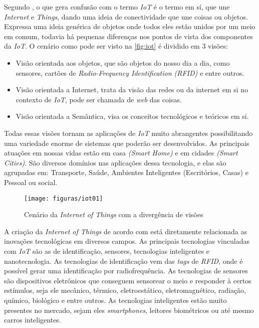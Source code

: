 \par Segundo , o que gera confus\~ao com o termo \emph{IoT} é o termo em sí, que une \emph{Internet} e \emph{Things}, dando uma ideia de conectividade que une coisas ou objetos. Expressa uma ideia genérica de objetos onde todos eles est\~ao unidos por um meio em comum, todavia há pequenas diferenças nos pontos de vista dos componentes da \emph{IoT}. O cenário como pode ser visto na \autoref{fig:iot} é dividido em 3 visões:
\begin{itemize}
    \item Visão orientada aos objetos, que são objetos do nosso dia a dia, como sensores, cart\~oes de \emph{Radio-Frequency Identification (RFID)} e entre outros.
    \item Visão orientada a Internet, trata da visão das redes ou da internet em si no contexto de \emph{IoT}, pode ser chamada de \emph{web} das coisas.
    \item Visão orientada a Semântica, visa os conceitos tecnol\'ogicos e te\'oricos em si.
\end{itemize}
Todas essas vis\~oes tornam as aplicações de \emph{IoT} muito abrangentes possibilitando uma variedade enorme de sistemas que poderão ser desenvolvidos. As principais atuações em nossas vidas estão em casa \emph{(Smart Home)} e em cidades \emph{(Smart Cities)}. São diversos domínios nas aplicações dessa tecnologia, e elas são agrupadas em: Transporte, Saúde, Ambientes Inteligentes (Escritórios, Casas) e Pessoal ou social.

\begin{figure}[ht]
	\caption{Cen\'ario da \emph{Internet of Things} com a diverg\^encia de vis\~oes}
	\centering
		\texttt{[image: figuras/iot01]}
    \label{fig:iot}	
\end{figure}

\par A criação da \emph{Internet of Things} de acordo com  está diretamente relacionada as inovações tecnológicas em diversos campos. As principais tecnologias vinculadas com \emph{IoT} são as de identificação, sensores, tecnologias inteligentes e nanotecnologia.
As tecnologias de identificação vem das \emph{tags} de \emph{RFID}, onde é possível gerar uma identificação por radiofrequência.
As tecnologias de sensores são dispositivos eletrônicos que conseguem sensorear o meio e responder à certos estímulos, seja ele mecânico, térmico, eletroestático, eletromagnético, radiação, químico, biológico e entre outros.
As tecnologias inteligentes est\~ao muito presentes no mercado, sejam eles \emph{smartphones}, leitores biométricos ou até mesmo carros inteligentes.

